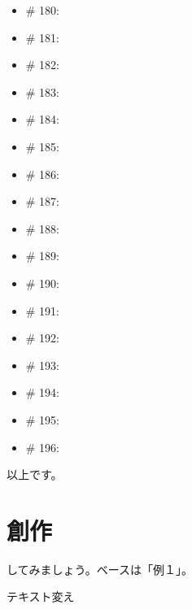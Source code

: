 \documentclass[dvipdfmx,autodetect-engine,10pt,b5paper,papersize,openany,dvipsnames]{jsbook}
\begin{document}
\begin{multicols}{3}
\begin{itemize}
\item \# 180: \quad {}
\item \# 181: \quad {}
\item \# 182: \quad {}
\item \# 183: \quad {}
\item \# 184: \quad {}
\item \# 185: \quad {}
\item \# 186: \quad {}
\item \# 187: \quad {}
\item \# 188: \quad {}
\item \# 189: \quad {}
\end{itemize}

\begin{itemize}
\item \# 190: \quad {}
\item \# 191: \quad {}
\item \# 192: \quad {}
\item \# 193: \quad {}
\item \# 194: \quad {}
\item \# 195: \quad {}
\item \# 196: \quad {}
\end{itemize}

\end{multicols}

以上です。


\section{創作}
してみましょう。ベースは「例１」。

テキスト変え
\end{document}
